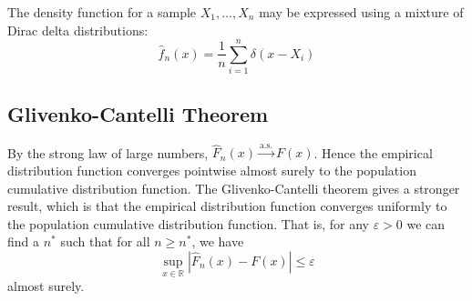 \documentclass[11pt]{report} %
\begin{document}
The density function for a sample $X_{1}, \dots, X_{n}$ may be expressed using a mixture of Dirac delta distributions:
\begin{equation}
\widehat{f}_{n}\left(x\right) = \dfrac{1}{n}\sum_{i = 1}^{n}\delta\left(x - X_{i}\right)
\end{equation}

\subsection{Glivenko-Cantelli Theorem}

By the strong law of large numbers, $\widehat{F}_{n}\left(x\right) \overset{\mathrm{a.s.}}{\to} F\left(x\right)$. Hence the empirical distribution function converges pointwise almost surely to the population cumulative distribution function. The Glivenko-Cantelli theorem gives a stronger result, which is that the empirical distribution function converges uniformly to the population cumulative distribution function. That is, for any $\varepsilon > 0$ we can find a $n^{*}$ such that for all $n \geq n^{*}$, we have 
\begin{equation}
\sup_{x \in \mathbb{R}}\left|\widehat{F}_{n}\left(x\right) - F\left(x\right)\right| \leq \varepsilon
\end{equation}
almost surely.
\end{document}
